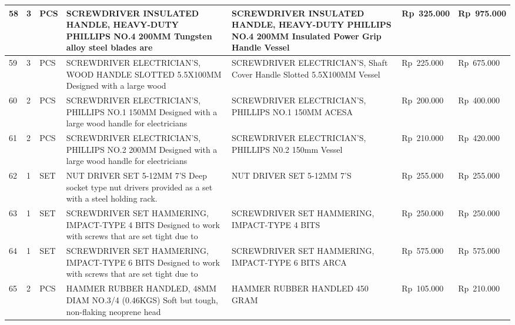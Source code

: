 \documentclass[9pt,a4paper,landscape]{article}
\begin{document}
\begin{longtable}{|C{0.6cm}|C{0.6cm}|C{0.8cm}|L{8.0cm}|L{9.5cm}|R{2.5cm}|R{2.5cm}|}
58 & 3 & PCS &
  SCREWDRIVER INSULATED HANDLE, HEAVY-DUTY\newline
  PHILLIPS NO.4 200MM Tungsten alloy steel blades are &
  SCREWDRIVER INSULATED HANDLE, HEAVY-DUTY PHILLIPS NO.4\newline
  200MM Insulated Power Grip Handle Vessel &
  Rp~325.000 & Rp~975.000 \\
\hline

59 & 3 & PCS &
  SCREWDRIVER ELECTRICIAN'S, WOOD HANDLE\newline
  SLOTTED 5.5X100MM Designed with a large wood &
  SCREWDRIVER ELECTRICIAN'S, Shaft Cover Handle Slotted\newline
  5.5X100MM Vessel &
  Rp~225.000 & Rp~675.000 \\
\hline

60 & 2 & PCS &
  SCREWDRIVER ELECTRICIAN'S, PHILLIPS NO.1 150MM\newline
  Designed with a large wood handle for electricians &
  SCREWDRIVER ELECTRICIAN'S, PHILLIPS NO.1 150MM ACESA &
  Rp~200.000 & Rp~400.000 \\
\hline

61 & 2 & PCS &
  SCREWDRIVER ELECTRICIAN'S, PHILLIPS NO.2 200MM\newline
  Designed with a large wood handle for electricians &
  SCREWDRIVER ELECTRICIAN'S, PHILLIPS N0.2 150mm Vessel &
  Rp~210.000 & Rp~420.000 \\
\hline

62 & 1 & SET &
  NUT DRIVER SET 5-12MM 7'S\newline
  Deep socket type nut drivers provided as a set\newline
  with a steel holding rack. &
  NUT DRIVER SET 5-12MM 7'S &
  Rp~255.000 & Rp~255.000 \\
\hline

63 & 1 & SET &
  SCREWDRIVER SET HAMMERING, IMPACT-TYPE 4 BITS\newline
  Designed to work with screws that are set tight due to &
  SCREWDRIVER SET HAMMERING, IMPACT-TYPE 4 BITS &
  Rp~250.000 & Rp~250.000 \\
\hline

64 & 1 & SET &
  SCREWDRIVER SET HAMMERING, IMPACT-TYPE 6 BITS\newline
  Designed to work with screws that are set tight due to &
  SCREWDRIVER SET HAMMERING, IMPACT-TYPE 6 BITS ARCA &
  Rp~575.000 & Rp~575.000 \\
\hline

65 & 2 & PCS &
  HAMMER RUBBER HANDLED, 48MM DIAM NO.3/4\newline
  (0.46KGS) Soft but tough, non-flaking neoprene head &
  HAMMER RUBBER HANDLED 450 GRAM &
  Rp~105.000 & Rp~210.000 \\
\hline


\end{longtable}
\end{document}
